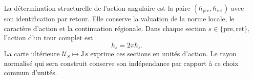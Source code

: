 La détermination structurelle de l’action angulaire est la paire
\((\hbar_{\mathrm{pre}},\hbar_{\mathrm{ret}})\) avec son
identification par retour. Elle conserve la valuation de la norme
locale, le caractère d’action et la continuation régionale.
Dans chaque section \(s\in\{\mathrm{pre},\mathrm{ret}\}\), l’action
d’un tour complet est
\begin{equation}
 h_s=2\pi\hbar_s.
 \label{x_reciprocidad:iv:action:vuelta}
\end{equation}
La carte ultérieure \(\mathcal U_S\mapsto\mathrm{J\,s}\) exprime
ces sections en unités d’action. Le rayon normalisé qui
sera construit conserve son indépendance par rapport à ce choix
commun d’unités.

